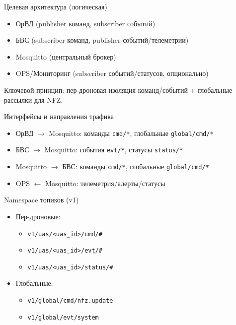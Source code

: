 \documentclass[aspectratio=169]{beamer}
\begin{document}
\begin{frame}[fragile]{Целевая архитектура (логическая)}
\begin{itemize}
  \item ОрВД (publisher команд, subscriber событий)
  \item БВС (subscriber команд, publisher событий/телеметрии)
  \item Mosquitto (центральный брокер)
  \item OPS/Мониторинг (subscriber событий/статусов, опционально)
\end{itemize}
\vspace{1em}
Ключевой принцип: пер-дроновая изоляция команд/событий + глобальные рассылки для NFZ.
\end{frame}

\begin{frame}[fragile]{Интерфейсы и направления трафика}
\begin{itemize}
  \item ОрВД $\rightarrow$ Mosquitto: команды \texttt{cmd/*}, глобальные \texttt{global/cmd/*}
  \item БВС $\rightarrow$ Mosquitto: события \texttt{evt/*}, статусы \texttt{status/*}
  \item Mosquitto $\rightarrow$ БВС: команды \texttt{cmd/*}, глобальные \texttt{global/cmd/*}
  \item OPS $\leftarrow$ Mosquitto: телеметрия/алерты/статусы
\end{itemize}
\end{frame}

\begin{frame}[fragile]{Namespace топиков (v1)}
\begin{itemize}
  \item Пер-дроновые:
  \begin{itemize}
    \item \texttt{v1/uas/<uas\_id>/cmd/\#}
    \item \texttt{v1/uas/<uas\_id>/evt/\#}
    \item \texttt{v1/uas/<uas\_id>/status/\#}
  \end{itemize}
  \item Глобальные:
  \begin{itemize}
    \item \texttt{v1/global/cmd/nfz.update}
    \item \texttt{v1/global/evt/system}
  \end{itemize}
\end{itemize}
\end{frame}
\end{document}

